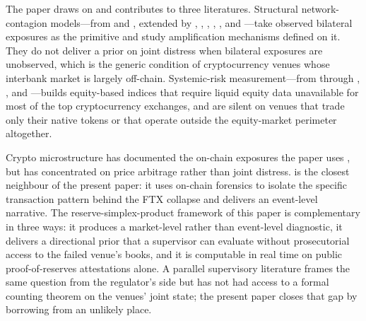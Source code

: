 \documentclass[12pt]{article}
\theoremstyle{sampledef}
\theoremstyle{sampleplain}
\theoremstyle{sampleremark}
\newcommand{\1}{\mathbf{1}}
\begin{document}
The paper draws on and contributes to three literatures.
Structural network-contagion models---from \citet{AllenGale2000} and
\citet{FreixasParigiRochet2000}, extended by
\citet{EliottGolubJackson2014}, \citet{AcemogluOzdaglarTahbaz2015},
\citet{GlassermanYoung2015}, \citet{RochetTirole1996},
\citet{CabralesGaleGottardi2016}, and \citet{DuffieZhu2011}---take
observed bilateral exposures as the primitive and study amplification
mechanisms defined on it. They do not deliver a prior on joint
distress when bilateral exposures are unobserved, which is the
generic condition of cryptocurrency venues whose interbank market is
largely off-chain. Systemic-risk measurement---from
\citet{AdrianBrunnermeier2016CoVaR} through
\citet{AchariaEtAl2017SES}, \citet{BrownleesEngle2017SRISK}, and
\citet{BillioEtAl2012}---builds equity-based indices that require
liquid equity data unavailable for most of the top cryptocurrency
exchanges, and are silent on venues that trade only their native
tokens or that operate outside the equity-market perimeter altogether.

Crypto microstructure has documented the on-chain exposures the paper
uses \citep{MakarovSchoar2020, GriffinShams2020,
Griffin-Kruger-Mei2023, FooterKarolyi2023, AlexanderDeng2023,
Cong-Li-Wang2021, FootcaultFuchsGoyalKaplan2024,
LiuTsyvinski2021, GofmanUeda2023,
Aramonte-Huang-Schrimpf2021, Fahlenbrach-Kirchler-Kremer2024},
but has concentrated on price arbitrage rather than joint distress.
\citet{Griffin-Kruger-Mei2023} is the closest neighbour of the
present paper: it uses on-chain forensics to isolate the specific
transaction pattern behind the FTX collapse and delivers an
event-level narrative. The reserve-simplex-product framework of
this paper is complementary in three ways: it produces a market-level
rather than event-level diagnostic, it delivers a directional prior
that a supervisor can evaluate without prosecutorial access to the
failed venue's books, and it is computable in real time on public
proof-of-reserves attestations alone. A parallel supervisory
literature \citep{BCBS2021Crypto, FSB2023Crypto, Aldasoro2023Stablecoin}
frames the same question from the regulator's side but has not had
access to a formal counting theorem on the venues' joint state;
the present paper closes that gap by borrowing from an unlikely
place.
\end{document}
